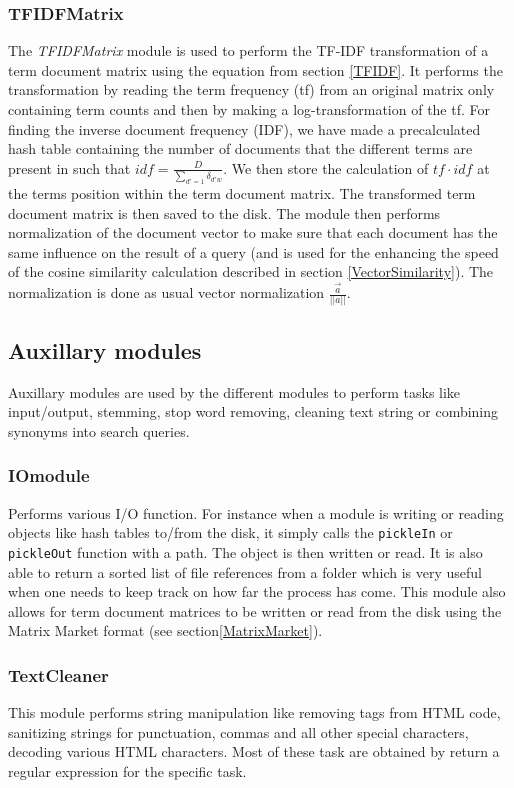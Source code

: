 \subsubsection{TFIDFMatrix}
The \textit{TFIDFMatrix} module is used to perform the TF-IDF
transformation of a term document matrix using the equation from
section \ref{TFIDF}. It performs the transformation by reading the
term frequency (tf) from an original matrix only containing term
counts and then by making a log-transformation of the tf. For finding
the inverse document frequency (IDF), we have made a precalculated
hash table containing the number of documents that the different terms
are present in such that $\mathit{idf} = \frac{D}{\sum_{d\prime =
    1}\delta_{d\prime w}}$. We then store the calculation of
$\mathit{tf} \cdot \mathit{idf}$ at the terms position within the term
document matrix. The transformed term document matrix is then saved to
the disk. The module then performs normalization of the document
vector to make sure that each document has the same influence on the
result of a query (and is used for the enhancing the speed of the
cosine similarity calculation described in section
\ref{VectorSimilarity}). The normalization is done as usual vector
normalization $\frac{\overrightarrow{a}}{||a||}$.

\subsection{Auxillary modules\label{AuxModules}}

Auxillary modules are used by the different modules to perform tasks
like input/output, stemming, stop word removing, cleaning text string
or combining synonyms into search queries.

\subsubsection{IOmodule}
Performs various I/O function. For instance when a module is writing
or reading objects like hash tables to/from the disk, it simply calls
the \texttt{pickleIn} or \texttt{pickleOut} function with a path. The
object is then written or read. It is also able to return a sorted
list of file references from a folder which is very useful when one
needs to keep track on how far the process has come. This module also
allows for term document matrices to be written or read from the disk
using the Matrix Market format (see section\ref{MatrixMarket}).

\subsubsection{TextCleaner}
This module performs string manipulation like removing tags from HTML
code, sanitizing strings for punctuation, commas and all other special
characters, decoding various HTML characters. Most of these task are
obtained by return a regular expression for the specific task.

